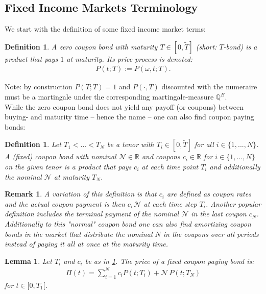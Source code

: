 \documentclass[12pt]{article}
\newtheorem{lemma}[theorem]{Lemma}
\newtheorem{remark}[theorem]{Remark}
\newtheorem{definition}[theorem]{Definition}
\begin{document}
	\subsection{Fixed Income Markets Terminology}
	We start with the definition of some fixed income market terms:
	\begin{definition}
		A \emph{zero coupon bond} with maturity $T \in [0,\tilde{T}]$ (short: $T$-bond) is a product that pays $1$ at maturity. Its price process is denoted:
		\begin{align*}
			P(t;T) := P(\omega,t;T).
		\end{align*}
	\end{definition}
	Note: by construction $P(T;T) = 1$ and $P(\cdot, T)$ discounted with the numeraire must be a martingale under the corresponding martingale-measure $\mathbb{Q}^B$.\\
	While the zero coupon bond does not yield any payoff (or coupons) between buying- and maturity time -- hence the name -- one can also find coupon paying bonds:
	\begin{definition}\label{def:couponbond}
		Let $T_1 < ... < T_N$ be a tenor with $T_i \in [0,\tilde{T}]$ for all $i\in \{1, ...,N\}$.\\
		A \emph{(fixed) coupon bond} with nominal $\mathcal{N} \in \mathbb{R}$ and  coupons $c_i \in \mathbb{R}$ for $i\in \{1, ...,N\}$ on the given tenor is a product that pays $c_i$ at each time point $T_i$ and additionally the nominal $\mathcal{N}$ at maturity $T_N$.
	\end{definition}
	\begin{remark}
		A variation of this definition is that $c_i$ are defined as coupon rates and the actual coupon payment is then $c_i\, \mathcal{N}$ at each time step $T_i$. Another popular definition includes the terminal payment of the nominal $\mathcal{N}$ in the last coupon $c_N$. \\
		Additionally to this "normal" coupon bond one can also find \emph{amortizing} coupon bonds in the market that distribute the nominal $N$ in the coupons over all periods instead of paying it all at once at the maturity time.
	\end{remark}
	\begin{lemma}
		Let $T_i$ and $c_i$ be as in \cref{def:couponbond}. 
		The price of a fixed coupon paying bond is:
		\begin{align}\label{eq:pricecouponbond}
			\Pi(t)=\sum_{i=1}^{N}c_i P(t;T_i) + \mathcal{N}\,P(t;T_N)
		\end{align}
		for $t\in [0,T_1[$.
	\end{lemma}
\end{document}

